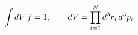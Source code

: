 \documentclass[preview]{standalone}
\begin{document}
\begin{align*}
\special{dvisvgm:raw <g id='unique000'>}\int dV\,f=1,\qquad dV=\prod_{i=1}^{N}d^3r_i\,d^3p_i\special{dvisvgm:raw </g>}
\end{align*}
\end{document}

